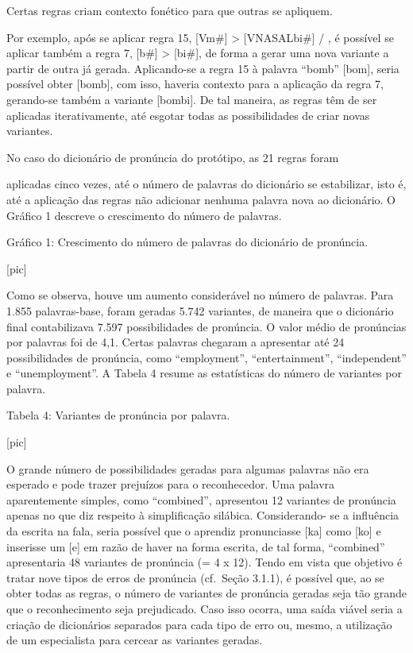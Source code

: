   Certas regras criam contexto fon\'etico para  que  outras  se  apliquem.

Por exemplo, ap\'os se aplicar regra 15, {[}Vm\#{]} \textgreater{}
{[}VNASALbi\#{]} / , \'e poss\'ivel se aplicar tamb\'em a regra 7, {[}b\#{]}
\textgreater{} {[}bi\#{]}, de forma a gerar uma nova variante a partir
de outra j\'a gerada. Aplicando-se a regra 15 à palavra ``bomb''
{[}bom{]}, seria poss\'ivel obter {[}bomb{]}, com isso, haveria contexto
para a aplica\c{c}\~ao da regra 7, gerando-se tamb\'em a variante {[}bombi{]}.
De tal maneira, as regras t\^em de ser aplicadas iterativamente, at\'e
esgotar todas as possibilidades de criar novas variantes.

  No caso do dicion\'ario de pron\'uncia do prot\'otipo, as  21  regras  foram

aplicadas cinco vezes, at\'e o n\'umero de palavras do dicion\'ario se
estabilizar, isto \'e, at\'e a aplica\c{c}\~ao das regras n\~ao adicionar nenhuma
palavra nova ao dicion\'ario. O Gr\'afico 1 descreve o crescimento do n\'umero
de palavras.

Gr\'afico 1: Crescimento do n\'umero de palavras do dicion\'ario de pron\'uncia.

                                [pic]

Como se observa, houve um aumento consider\'avel no n\'umero de palavras.
Para 1.855 palavras-base, foram geradas 5.742 variantes, de maneira que
o dicion\'ario final contabilizava 7.597 possibilidades de pron\'uncia. O
valor m\'edio de pron\'uncias por palavras foi de 4,1. Certas palavras
chegaram a apresentar at\'e 24 possibilidades de pron\'uncia, como
``employment'', ``entertainment'', ``independent'' e ``unemployment''. A
Tabela 4 resume as estat\'isticas do n\'umero de variantes por palavra.

            Tabela 4: Variantes de pron\'uncia por palavra.

                                [pic]

O grande n\'umero de possibilidades geradas para algumas palavras n\~ao era
esperado e pode trazer preju\'izos para o reconhecedor. Uma palavra
aparentemente simples, como ``combined'', apresentou 12 variantes de
pron\'uncia apenas no que diz respeito à simplifica\c{c}\~ao sil\'abica.
Considerando- se a influ\^encia da escrita na fala, seria poss\'ivel que o
aprendiz pronunciasse {[}ka{]} como {[}ko{]} e inserisse um {[}e{]} em
raz\~ao de haver na forma escrita, de tal forma, ``combined'' apresentaria
48 variantes de pron\'uncia (= 4 x 12). Tendo em vista que objetivo \'e
tratar nove tipos de erros de pron\'uncia (cf.~Se\c{c}\~ao 3.1.1), \'e poss\'ivel
que, ao se obter todas as regras, o n\'umero de variantes de pron\'uncia
geradas seja t\~ao grande que o reconhecimento seja prejudicado. Caso isso
ocorra, uma sa\'ida vi\'avel seria a cria\c{c}\~ao de dicion\'arios separados para
cada tipo de erro ou, mesmo, a utiliza\c{c}\~ao de um especialista para
cercear as variantes geradas.

